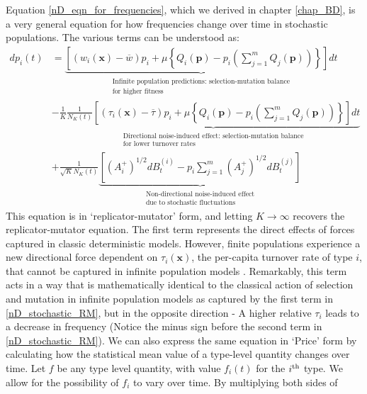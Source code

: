 Equation \eqref{nD_eqn_for_frequencies}, which we derived in chapter \ref{chap_BD}, is a very general equation for how frequencies change over time in stochastic populations. The various terms can be understood as:
\begin{equation}
\label{nD_stochastic_RM}
\begin{aligned}
dp_i(t) &= \underbrace{\left[(w_i(\mathbf{x}) - \overline{w})p_i + \mu\left\{Q_i(\mathbf{p}) - p_i\left(\sum\limits_{j=1}^{m}Q_j(\mathbf{p})\right)\right\}\right]dt}_{\substack{\text{Infinite population predictions: selection-mutation balance} \\ \text{for higher fitness}}}\\
&- \frac{1}{K}\underbrace{\frac{1}{N_{K}(t)}\left[(\tau_i(\mathbf{x}) - \overline{\tau})p_i + \mu\left\{Q_i(\mathbf{p}) - p_i\left(\sum\limits_{j=1}^{m}Q_j(\mathbf{p})\right)\right\}\right]dt}_{\substack{\text{Directional noise-induced effect: selection-mutation balance}\\\text{for lower turnover rates}}}\\
&+ \frac{1}{\sqrt{K}N_{K}(t)}\underbrace{\left[\left(A^{+}_{i}\right)^{1/2}dB^{(i)}_t - p_i\sum\limits_{j=1}^{m}\left(A^{+}_{j}\right)^{1/2}dB^{(j)}_t\right]}_{\substack{\text{Non-directional noise-induced effect}\\\text{due to stochastic fluctuations}}}
\end{aligned}
\end{equation}
This equation is in `replicator-mutator' form, and letting $K \to \infty$ recovers the replicator-mutator equation. The first term represents the direct effects of forces captured in classic deterministic models. However, finite populations experience a new directional force dependent on $\tau_i(\mathbf{x})$, the per-capita turnover rate of type $i$, that cannot be captured in infinite population models \citep{kuosmanen_turnover_2022}. Remarkably, this term acts in a way that is mathematically identical to the classical action of selection and mutation in infinite population models as captured by the first term in \eqref{nD_stochastic_RM}, but in the opposite direction - A higher relative $\tau_i$ leads to a decrease in frequency (Notice the minus sign before the second term in \eqref{nD_stochastic_RM}). We can also express the same equation in `Price' form by calculating how the statistical mean value of a type-level quantity changes over time. Let $f$ be any type level quantity, with value $f_i(t)$ for the $i\textsuperscript{th}$ type. We allow for the possibility of $f_i$ to vary over time. By multiplying both sides of
